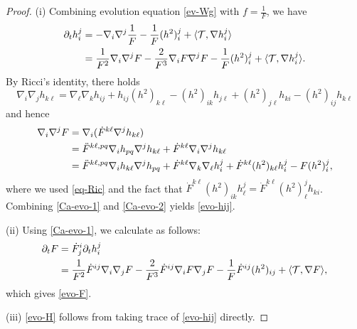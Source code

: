 \documentclass[11pt,reqno]{amsart}
\theoremstyle{definition}
\theoremstyle{remark}
\numberwithin{equation}{section}
\renewcommand{\(}{\left(}
\renewcommand{\)}{\right)}
\renewcommand{\-}{\overline}
\begin{document}
\begin{proof}
	(i) Combining evolution equation \eqref{ev-Wg} with $f=\frac{1}{F}$,   we have
	\begin{align}
		\partial_t{h_i^j}&=-\nabla_i\nabla^j{\frac{1}{F}}-\frac{1}{F}(h^2)_i^j+\langle \mathcal{T},\nabla h_i^j\rangle\notag\\
		&=\frac{1}{F^2}\nabla_i\nabla^j{F}-\frac{2}{F^3}\nabla_i{F}\nabla^j{F}-\frac{1}{F}(h^2)_i^j+\langle \mathcal{T},\nabla h_i^j\rangle.\label{Ca-evo-1}
	\end{align}
By Ricci's identity, there holds
\begin{equation}\label{eq-Ric}
	\nabla_i\nabla_j h_{k\ell}=\nabla_{\ell}\nabla_{k} h_{ij}+h_{ij}(h^2)_{k\ell}-(h^2)_{ik}h_{j\ell}+(h^2)_{j\ell}h_{ki}-(h^2)_{ij}h_{k\ell}
\end{equation}
and hence
\begin{align}
	\nabla_i\nabla^j{F}&=\nabla_i(\dot{F}^{k\ell}\nabla^j{h_{k\ell}})\notag\\
	&=\ddot{F}^{k\ell,pq}\nabla_i{h_{pq}}\nabla^j{h_{k\ell}}+\dot{F}^{k\ell}\nabla_i\nabla^j{h_{k\ell}}\notag\\
	&=\ddot{F}^{k\ell,pq}\nabla_i{h_{k\ell}}\nabla^j{h_{pq}}+\dot{F}^{k\ell}\nabla_k\nabla_{\ell}h_i^j+\dot{F}^{k\ell}(h^2)_{k\ell}h_i^j-F(h^2)_i^j,\label{Ca-evo-2}
\end{align}
where we used \eqref{eq-Ric} and the fact that $\dot{F}^{k\ell}(h^2)_{ik}h_{\ell}^j=\dot{F}^{k\ell}(h^2)_{\ell}^jh_{ki}$. Combining \eqref{Ca-evo-1} and \eqref{Ca-evo-2} yields \eqref{evo-hij}.

(ii) Using \eqref{Ca-evo-1}, we calculate as follows:
\begin{align}
	\partial_t F&=\dot{F}_j^i\partial_t{h_i^j}\notag\\
	&=\frac{1}{F^2}\dot{F}^{ij}\nabla_i\nabla_j{F}-\frac{2}{F^3}\dot{F}^{ij}\nabla_i{F}\nabla_j{F}-\frac{1}{F}\dot{F}^{ij}(h^2)_{ij}+\langle \mathcal{T},\nabla F\rangle,
\end{align}
which gives \eqref{evo-F}.

(iii) \eqref{evo-H} follows from taking trace of \eqref{evo-hij} directly.


\end{proof}
\end{document}
